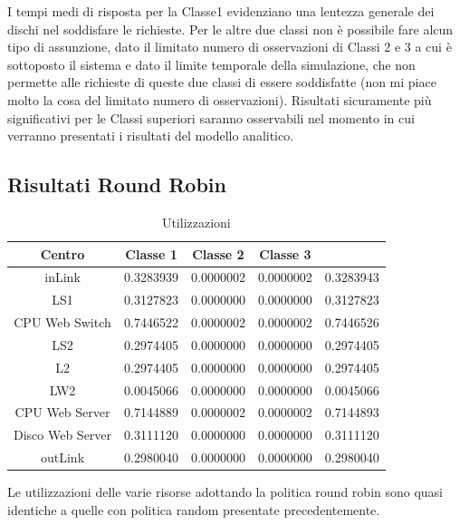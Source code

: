 I tempi medi di risposta per la Classe1 evidenziano una lentezza generale dei dischi nel soddisfare le richieste. Per le altre due classi non è possibile fare alcun tipo di assunzione, dato il limitato numero di osservazioni di Classi 2 e 3 a cui è sottoposto il sistema e dato il limite temporale della simulazione, che non permette alle richieste di queste due classi di essere soddisfatte (non mi piace molto la cosa del limitato numero di osservazioni). Risultati sicuramente più significativi per le Classi superiori saranno osservabili nel momento in cui verranno presentati i risultati del modello analitico.

\subsection{Risultati Round Robin}
\begin{table}[htbp]
\begin{center}
\begin{tabular}{|c|c|c|c|c|}
\hline
Centro	&Classe 1	&Classe 2	&Classe 3\\
\hline
\hline
inLink & 0.3283939 & 0.0000002 & 0.0000002 & 0.3283943 \\ \hline
LS1 & 0.3127823 & 0.0000000 & 0.0000000 & 0.3127823 \\ \hline
CPU Web Switch & 0.7446522 & 0.0000002 & 0.0000002 & 0.7446526 \\ \hline
LS2 & 0.2974405 & 0.0000000 & 0.0000000 & 0.2974405 \\ \hline
L2 & 0.2974405 & 0.0000000 & 0.0000000 & 0.2974405 \\ \hline
LW2 & 0.0045066 & 0.0000000 & 0.0000000 & 0.0045066 \\ \hline
CPU Web Server & 0.7144889 & 0.0000002 & 0.0000002 & 0.7144893 \\ \hline
Disco Web Server & 0.3111120 & 0.0000000 & 0.0000000 & 0.3111120 \\ \hline
outLink & 0.2980040 & 0.0000000 & 0.0000000 & 0.2980040 \\ \hline
\end{tabular}
\end{center}
\caption{Utilizzazioni}
\label{utilizzazioni}
\end{table}
Le utilizzazioni delle varie risorse adottando la politica round robin sono quasi identiche a quelle con politica random presentate precedentemente.
